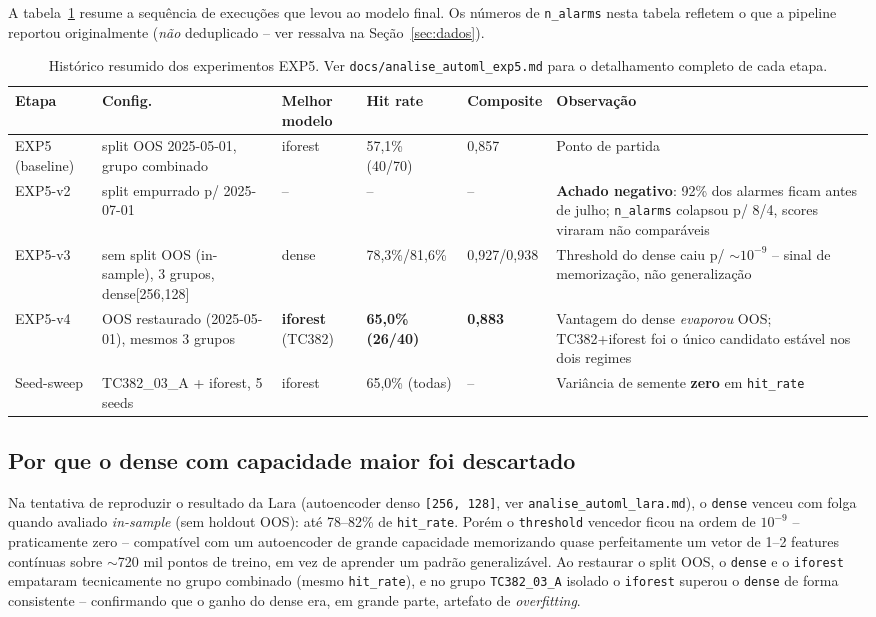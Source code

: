 \documentclass[11pt,a4paper]{article}
\begin{document}
A tabela~\ref{tab:historico} resume a sequência de execuções que levou ao
modelo final. Os números de \texttt{n\_alarms} nesta tabela refletem o que
a pipeline reportou originalmente (\emph{não} deduplicado -- ver ressalva
na Seção~\ref{sec:dados}).

\begin{table}[H]
\centering
\small
\begin{tabular}{@{}p{2.1cm}p{2.6cm}p{2.3cm}p{1.6cm}p{1.6cm}p{2.3cm}@{}}
\toprule
\textbf{Etapa} & \textbf{Config.} & \textbf{Melhor modelo} & \textbf{Hit rate} & \textbf{Composite} & \textbf{Observação} \\
\midrule
EXP5 (baseline) & split OOS 2025-05-01, grupo combinado & iforest & 57,1\% (40/70) & 0,857 & Ponto de partida \\
EXP5-v2 & split empurrado p/ 2025-07-01 & -- & -- & -- & \textbf{Achado negativo}: 92\% dos alarmes ficam antes de julho; \texttt{n\_alarms} colapsou p/ 8/4, scores viraram não comparáveis \\
EXP5-v3 & sem split OOS (in-sample), 3 grupos, dense[256,128] & dense & 78,3\%/81,6\% & 0,927/0,938 & Threshold do dense caiu p/ $\sim10^{-9}$ -- sinal de memorização, não generalização \\
EXP5-v4 & OOS restaurado (2025-05-01), mesmos 3 grupos & \textbf{iforest} (TC382) & \textbf{65,0\% (26/40)} & \textbf{0,883} & Vantagem do dense \emph{evaporou} OOS; TC382+iforest foi o único candidato estável nos dois regimes \\
Seed-sweep & TC382\_03\_A + iforest, 5 seeds & iforest & 65,0\% (todas) & -- & Variância de semente \textbf{zero} em \texttt{hit\_rate} \\
\bottomrule
\end{tabular}
\caption{Histórico resumido dos experimentos EXP5. Ver \texttt{docs/analise\_automl\_exp5.md} para o detalhamento completo de cada etapa.}
\label{tab:historico}
\end{table}

\subsection{Por que o dense com capacidade maior foi descartado}

Na tentativa de reproduzir o resultado da Lara (autoencoder denso
\texttt{[256, 128]}, ver \texttt{analise\_automl\_lara.md}), o \texttt{dense}
venceu com folga quando avaliado \emph{in-sample} (sem holdout OOS): até
78--82\% de \texttt{hit\_rate}. Porém o \texttt{threshold} vencedor ficou na
ordem de $10^{-9}$ -- praticamente zero -- compatível com um autoencoder de
grande capacidade memorizando quase perfeitamente um vetor de 1--2 features
contínuas sobre $\sim$720 mil pontos de treino, em vez de aprender um padrão
generalizável. Ao restaurar o split OOS, o \texttt{dense} e o \texttt{iforest}
empataram tecnicamente no grupo combinado (mesmo \texttt{hit\_rate}), e no
grupo \texttt{TC382\_03\_A} isolado o \texttt{iforest} superou o
\texttt{dense} de forma consistente -- confirmando que o ganho do dense era,
em grande parte, artefato de \emph{overfitting}.
\end{document}
